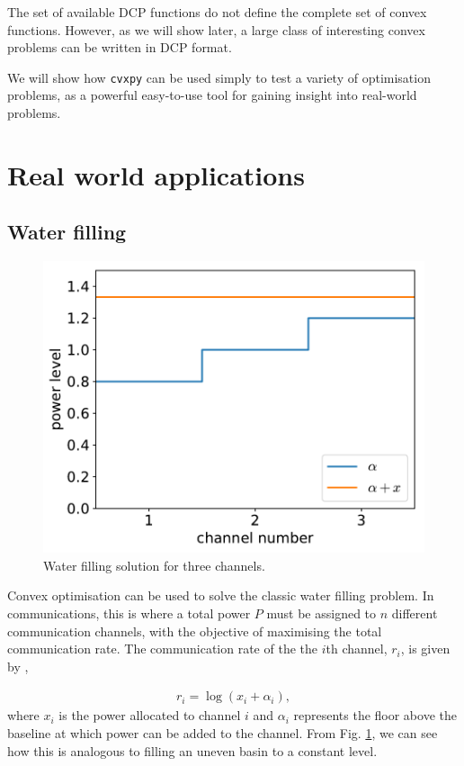 \documentclass[twocolumn,secnumarabic,amssymb, nobibnotes, aps, prl,superscriptaddress]{revtex4-1}
\begin{document}
The set of available DCP functions do not define the complete set of convex functions. However, as we will show later, a large class of interesting convex problems can be written in DCP format.

We will show how \texttt{cvxpy} can be used simply to test a variety of optimisation problems, as a powerful easy-to-use tool for gaining insight into real-world problems.

\section{Real world applications}
\subsection{Water filling}
\begin{figure}
\includegraphics[width=1.0\linewidth]{water_filling_plot.pdf}
\caption{\label{fig:waterfilling}Water filling solution for three channels.}
\end{figure}

Convex optimisation can be used to solve the classic water filling problem.  In communications, this is where a total power $P$ must be assigned to $n$ different communication channels, with the objective of maximising the total communication rate.  The communication rate of the the $i$th channel, $r_i$, is given by \cite[p.245]{cvxpybook},

\begin{align}
r_i = \log(x_i+\alpha_i),
\end{align}
where $x_i$ is the power allocated to channel $i$ and $\alpha_i$ represents the floor above the baseline at which power can be added to the channel.  From Fig. \ref{fig:waterfilling}, we can see how this is analogous to filling an uneven basin to a constant level. 
\end{document}
